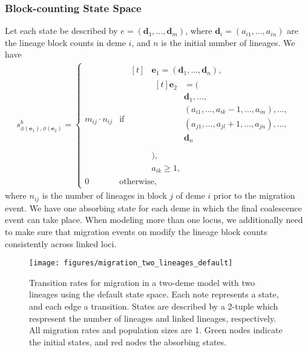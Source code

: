 \subsubsection{Block-counting State Space}\label{subsubsec:migration_block_counting}
Let each state be described by $e=(\mathbf{d}_1, \ldots, \mathbf{d}_m)$, where $\mathbf{d}_i=(a_{i1}, \ldots, a_{in})$ are the lineage block counts in deme $i$, and $n$ is the initial number of lineages.
We have
\begin{align*}
    s^b_{\phi(\mathbf{e}_1),\phi(\mathbf{e}_2)} =
    \begin{cases}
        m_{ij} \cdot n_{ij} & \text{if }
        \begin{aligned}[t]
            & \mathbf{e}_1=(\mathbf{d}_1,\dots,\mathbf{d}_n), \\
            & \begin{aligned}[t]
                  \mathbf{e}_2 &= ( \\
                  & \mathbf{d}_1, \dots, \\
                  & (a_{i1},\dots,a_{ik}-1,\dots,a_{in}), \dots, \\
                  & (a_{j1},\dots,a_{jl}+1,\dots,a_{jn}), \dots, \\
                  & \mathbf{d}_n \\
            \end{aligned} \\
            & ), \\
            & a_{ik} \geq 1,
        \end{aligned} \\
        0 & \text{otherwise,}
    \end{cases}
\end{align*}
where $n_{ij}$ is the number of lineages in block $j$ of deme $i$ prior to the migration event.
We have one absorbing state for each deme in which the final coalescence event can take place.
When modeling more than one locus, we additionally need to make sure that migration events on modify the lineage block counts consistently across linked loci.

\begin{figure}[H]
    \centering
    \texttt{[image: figures/migration\_two\_lineages\_default]}
    \caption{
        Transition rates for migration in a two-deme model with two lineages using the default state space.
        Each note represents a state, and each edge a transition.
        States are described by a 2-tuple which respresent the number of lineages and linked lineages, respectively.
        All migration rates and population sizes are 1.
        Green nodes indicate the initial states, and red nodes the absorbing states.
    }
    \label{fig:migration_two_lineages_default}
\end{figure}

